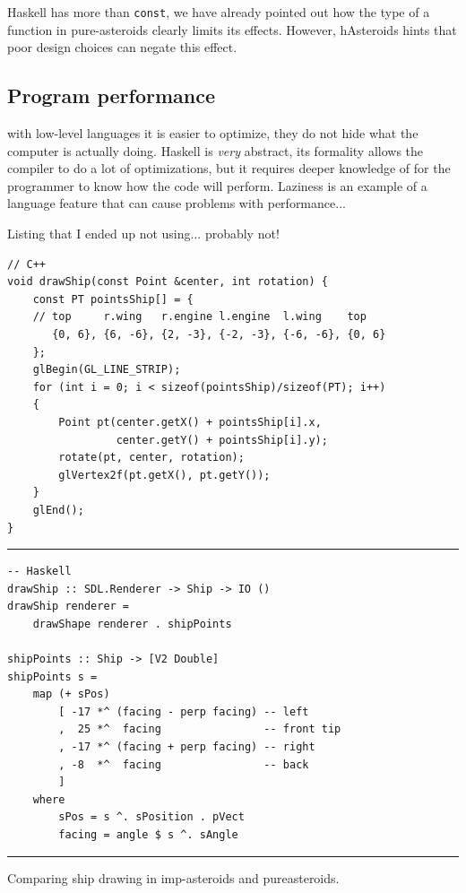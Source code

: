 \documentclass[
  digital, %
  color,   %
  table,   %
  oneside, %
  lof,     %
  lot,     %
]{fithesis3}
\begin{document}
{Haskell has more than \texttt{const}, we have already pointed out how
the type of a function in pure-asteroids clearly limits its effects.
However, hAsteroids hints that poor design choices can negate this effect.

\subsection*{Program performance}
with low-level languages it is easier to optimize, they do not hide
what the computer is actually doing. Haskell is \emph{very} abstract,
its formality allows the compiler to do a lot of optimizations, but
it requires deeper knowledge of  for the programmer
to know how the code will perform. Laziness is an example
of a language feature that can cause problems with performance...

Listing that I ended up not using... probably not!
\begin{listing}[hbt]
\begin{verbatim}
// C++
void drawShip(const Point &center, int rotation) {
    const PT pointsShip[] = {
    // top     r.wing   r.engine l.engine  l.wing    top
       {0, 6}, {6, -6}, {2, -3}, {-2, -3}, {-6, -6}, {0, 6}  
    };
    glBegin(GL_LINE_STRIP);
    for (int i = 0; i < sizeof(pointsShip)/sizeof(PT); i++)
    {
        Point pt(center.getX() + pointsShip[i].x, 
                 center.getY() + pointsShip[i].y);
        rotate(pt, center, rotation);
        glVertex2f(pt.getX(), pt.getY());
    }
    glEnd();
}
\end{verbatim}
\rule{\textwidth}{0.4pt}
\begin{verbatim}
-- Haskell
drawShip :: SDL.Renderer -> Ship -> IO ()
drawShip renderer =
    drawShape renderer . shipPoints

shipPoints :: Ship -> [V2 Double]
shipPoints s =
    map (+ sPos)
        [ -17 *^ (facing - perp facing) -- left
        ,  25 *^  facing                -- front tip
        , -17 *^ (facing + perp facing) -- right
        , -8  *^  facing                -- back
        ]
    where
        sPos = s ^. sPosition . pVect
        facing = angle $ s ^. sAngle
\end{verbatim}
\rule{\textwidth}{0.4pt}

\caption{Comparing ship drawing in imp-asteroids and pureasteroids.}
\label{changethelabelifyousuethisagain}
\end{listing}


}
\end{document}
